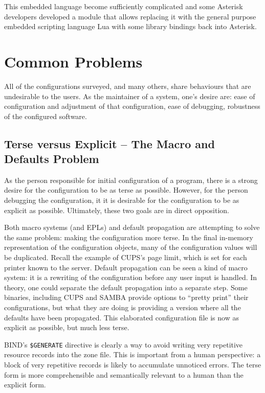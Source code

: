\documentclass[letterpaper,twocolumn,10pt]{article}
\begin{document}
This embedded language become sufficiently complicated and some Asterisk developers developed a module that allows replacing it with the general purpose embedded scripting language Lua with some library bindings back into Asterisk.

\section{Common Problems}
All of the configurations surveyed, and many others, share behaviours that are undesirable to the users. As the maintainer of a system, one's desire are: ease of configuration and adjustment of that configuration, ease of debugging, robustness of the configured software.

\subsection{Terse versus Explicit -- The Macro and Defaults Problem}
As the person responsible for initial configuration of a program, there is a strong desire for the configuration to be as terse as possible. However, for the person debugging the configuration, it it is desirable for the configuration to be as explicit as possible. Ultimately, these two goals are in direct opposition.

Both macro systems (and EPLs) and default propagation are attempting to solve the same problem: making the configuration more terse. In the final in-memory representation of the configuration objects, many of the configuration values will be duplicated. Recall the example of CUPS's page limit, which is set for each printer known to the server. Default propagation can be seen a kind of macro system: it is a rewriting of the configuration before any user input is handled. In theory, one could separate the default propagation into a separate step. Some binaries, including CUPS and SAMBA provide options to ``pretty print'' their configurations, but what they are doing is providing a version where all the defaults have been propagated. This elaborated configuration file is now as explicit as possible, but much less terse.

BIND's \texttt{\$GENERATE} directive is clearly a way to avoid writing very repetitive resource records into the zone file. This is important from a human perspective: a block of very repetitive records is likely to accumulate unnoticed errors. The terse form is more comprehensible and semantically relevant to a human than the explicit form.
\end{document}
